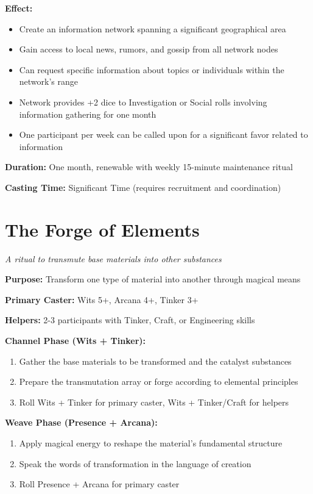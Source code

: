 \textbf{Effect:}
\begin{itemize}
\item Create an information network spanning a significant geographical area
\item Gain access to local news, rumors, and gossip from all network nodes
\item Can request specific information about topics or individuals within the network's range
\item Network provides +2 dice to Investigation or Social rolls involving information gathering for one month
\item One participant per week can be called upon for a significant favor related to information
\end{itemize}

\textbf{Duration:} One month, renewable with weekly 15-minute maintenance ritual

\textbf{Casting Time:} Significant Time (requires recruitment and coordination)

\section*{The Forge of Elements}
\textit{A ritual to transmute base materials into other substances}

\textbf{Purpose:} Transform one type of material into another through magical means

\textbf{Primary Caster:} Wits 5+, Arcana 4+, Tinker 3+

\textbf{Helpers:} 2-3 participants with Tinker, Craft, or Engineering skills

\textbf{Channel Phase (Wits + Tinker):}
\begin{enumerate}
\item Gather the base materials to be transformed and the catalyst substances
\item Prepare the transmutation array or forge according to elemental principles
\item Roll Wits + Tinker for primary caster, Wits + Tinker/Craft for helpers
\end{enumerate}

\textbf{Weave Phase (Presence + Arcana):}
\begin{enumerate}
\item Apply magical energy to reshape the material's fundamental structure
\item Speak the words of transformation in the language of creation
\item Roll Presence + Arcana for primary caster
\end{enumerate}

